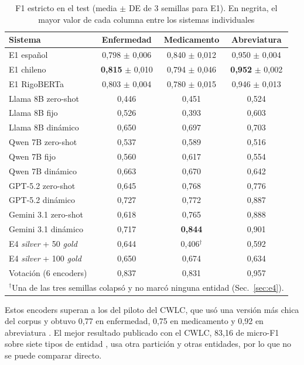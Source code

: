 \documentclass[10pt,journal,a4paper]{IEEEtran}
\begin{document}
\begin{table}[!t]
\centering
\caption{F1 estricto en el test (media $\pm$ DE de 3 semillas para E1). En negrita, el mayor valor de cada columna entre los sistemas individuales}
\label{tab:resultados}
\setlength{\tabcolsep}{3pt}
\begin{tabular}{lccc}
\toprule
Sistema & Enfermedad & Medicamento & Abreviatura \\
\midrule
E1 español & 0,798 $\pm$ 0,006 & 0,840 $\pm$ 0,012 & 0,950 $\pm$ 0,004 \\
E1 chileno & \textbf{0,815} $\pm$ 0,010 & 0,794 $\pm$ 0,046 & \textbf{0,952} $\pm$ 0,002 \\
E1 RigoBERTa & 0,803 $\pm$ 0,004 & 0,780 $\pm$ 0,015 & 0,946 $\pm$ 0,013 \\
\midrule
Llama 8B zero-shot & 0,446 & 0,451 & 0,524 \\
Llama 8B fijo & 0,526 & 0,393 & 0,603 \\
Llama 8B dinámico & 0,650 & 0,697 & 0,703 \\
Qwen 7B zero-shot & 0,537 & 0,589 & 0,516 \\
Qwen 7B fijo & 0,560 & 0,617 & 0,554 \\
Qwen 7B dinámico & 0,663 & 0,670 & 0,642 \\
\midrule
GPT-5.2 zero-shot & 0,645 & 0,768 & 0,776 \\
GPT-5.2 dinámico & 0,727 & 0,772 & 0,887 \\
Gemini 3.1 zero-shot & 0,618 & 0,765 & 0,888 \\
Gemini 3.1 dinámico & 0,717 & \textbf{0,844} & 0,901 \\
\midrule
E4 \emph{silver} + 50 \emph{gold} & 0,644 & 0,406$^\dagger$ & 0,592 \\
E4 \emph{silver} + 100 \emph{gold} & 0,650 & 0,674 & 0,634 \\
\midrule
Votación (6 encoders) & 0,837 & 0,831 & 0,957 \\
\bottomrule
\multicolumn{4}{l}{\footnotesize $^\dagger$Una de las tres semillas colapsó y no marcó ninguna entidad (Sec.~\ref{sec:e4}).}
\end{tabular}
\end{table}

Estos encoders superan a los del piloto del CWLC, que usó una versión más chica del corpus y obtuvo 0,77 en enfermedad, 0,75 en medicamento y 0,92 en abreviatura \cite{baez2020}. El mejor resultado publicado con el CWLC, 83,16 de micro-F1 sobre siete tipos de entidad \cite{rojas2022louhi}, usa otra partición y otras entidades, por lo que no se puede comparar directo.
\end{document}
